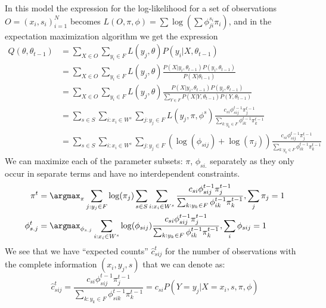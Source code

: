In this model the expression for the log-likelihood for a set of observations $O = (x_i,s_i)_{i=1}^N$ becomes $L(O,\pi,\phi)=\sum \log (\sum \phi_{ji}^{s_i}\pi_i)$, and in the expectation maximization algorithm we get the expression
\begin{equation*}
\begin{split}
Q(\theta,\theta_{t-1})%
&= \sum_{X\in O} \sum_{y_i \in F}
L(y_j,\theta)
P(y_i|X,\theta_{t-1})\\
&= \sum_{X\in O} \sum_{y_i \in F}
L(y_j,\theta)
\frac{P(X|y_i,\theta_{t-1})P(y_i,\theta_{t-1})}
{P(X|\theta_{t-1})}\\
&= \sum_{X\in O} \sum_{y_i \in F}
L(y_j,\theta)
\frac{P(X|y_i,\theta_{t-1})P(y_i,\theta_{t-1})}
{\sum_{Y\in F}P(X|Y,\theta_{t-1})P(Y,\theta_{t-1})}\\
&= \sum_{s \in S} \sum_{i: x_i\in W^s} \sum_{j: y_j \in F}
L(y_j,\pi,\phi^s)
\frac{c_{si}\phi^{t-1}_{sij}\pi^{t-1}_{j}}
{\sum_{k: y_k \in F}\phi^{t-1}_{ik}\pi^{t-1}_{k}}\\
&= \sum_{s \in S} \sum_{i: x_i\in W^s} \sum_{j: y_j \in F}
(\log(\phi_{sij}) + \log(\pi_j))
\frac{c_{si}\phi^{t-1}_{sij}\pi^{t-1}_{j}}
{\sum_{k: y_k \in F}\phi^{t-1}_{ik}\pi^{t-1}_{k}}
\end{split}
\end{equation*}
We can maximize each of the parameter subsets: $\pi$, $\phi_{si.}$ separately as they only occur in separate terms and have no interdependent constraints.
\begin{equation*}
\begin{split}
\pi^t &= \argmax_{\pi}
\sum_{j: y_j \in F}\log(\pi_j) \sum_{s \in S} \sum_{i: x_i\in W^s}
\frac{c_{si}\phi^{t-1}_{sij}\pi^{t-1}_{j}}{\sum_{k: y_k \in F}\phi^{t-1}_{ik}\pi^{t-1}_{k}}
, \sum_j\pi_j = 1\\
\phi_{s.j}^t &= \argmax_{\phi_{s.j}} \sum_{i: x_i\in W^s}
\log(\phi_{sij})
\frac{c_{si}\phi^{t-1}_{sij}\pi^{t-1}_{j}}
{\sum_{k: y_k \in F}\phi^{t-1}_{ik}\pi^{t-1}_{k}}
, \sum_i \phi_{sij} = 1
\end{split}
\end{equation*}
We see that we have ``expected counts'' $\hat c^t_{sij}$ for the number of observations with the complete information $(x_i,y_j,s)$ that we can denote as:
\begin{equation*}
\hat c^t_{sij} = \frac{c_{si}\phi^{t-1}_{sij}\pi^{t-1}_{j}}{\sum_{k: y_k \in F}\phi^{t-1}_{sik}\pi^{t-1}_{k}} = c_{si}P(Y=y_j|X=x_i,s,\pi, \phi)
\end{equation*}

